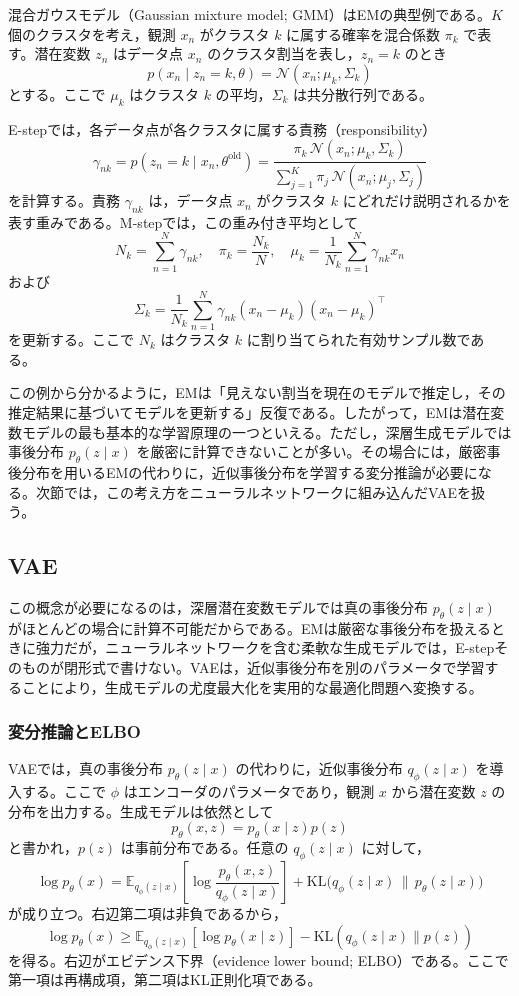 混合ガウスモデル（Gaussian mixture model; GMM）はEMの典型例である。\(K\) 個のクラスタを考え，観測 \(x_n\) がクラスタ \(k\) に属する確率を混合係数 \(\pi_k\) で表す。潜在変数 \(z_n\) はデータ点 \(x_n\) のクラスタ割当を表し，\(z_n=k\) のとき
\[
p(x_n \mid z_n=k,\theta)=\mathcal{N}(x_n;\mu_k,\Sigma_k)
\]
とする。ここで \(\mu_k\) はクラスタ \(k\) の平均，\(\Sigma_k\) は共分散行列である。

E-stepでは，各データ点が各クラスタに属する責務（responsibility）
\[
\gamma_{nk}
=
p(z_n=k \mid x_n,\theta^{\text{old}})
=
\frac{\pi_k\,\mathcal{N}(x_n;\mu_k,\Sigma_k)}
{\sum_{j=1}^{K}\pi_j\,\mathcal{N}(x_n;\mu_j,\Sigma_j)}
\]
を計算する。責務 \(\gamma_{nk}\) は，データ点 \(x_n\) がクラスタ \(k\) にどれだけ説明されるかを表す重みである。M-stepでは，この重み付き平均として
\[
N_k=\sum_{n=1}^{N}\gamma_{nk},\quad
\pi_k=\frac{N_k}{N},\quad
\mu_k=\frac{1}{N_k}\sum_{n=1}^{N}\gamma_{nk}x_n
\]
および
\[
\Sigma_k
=
\frac{1}{N_k}\sum_{n=1}^{N}\gamma_{nk}(x_n-\mu_k)(x_n-\mu_k)^{\top}
\]
を更新する。ここで \(N_k\) はクラスタ \(k\) に割り当てられた有効サンプル数である。

この例から分かるように，EMは「見えない割当を現在のモデルで推定し，その推定結果に基づいてモデルを更新する」反復である。したがって，EMは潜在変数モデルの最も基本的な学習原理の一つといえる。ただし，深層生成モデルでは事後分布 \(p_{\theta}(z \mid x)\) を厳密に計算できないことが多い。その場合には，厳密事後分布を用いるEMの代わりに，近似事後分布を学習する変分推論が必要になる。次節では，この考え方をニューラルネットワークに組み込んだVAEを扱う。

\subsection{VAE}

この概念が必要になるのは，深層潜在変数モデルでは真の事後分布 \(p_{\theta}(z \mid x)\) がほとんどの場合に計算不可能だからである。EMは厳密な事後分布を扱えるときに強力だが，ニューラルネットワークを含む柔軟な生成モデルでは，E-stepそのものが閉形式で書けない。VAEは，近似事後分布を別のパラメータで学習することにより，生成モデルの尤度最大化を実用的な最適化問題へ変換する。

\subsubsection{変分推論とELBO}

VAEでは，真の事後分布 \(p_{\theta}(z \mid x)\) の代わりに，近似事後分布 \(q_{\phi}(z \mid x)\) を導入する。ここで \(\phi\) はエンコーダのパラメータであり，観測 \(x\) から潜在変数 \(z\) の分布を出力する。生成モデルは依然として
\[
p_{\theta}(x,z)=p_{\theta}(x \mid z)p(z)
\]
と書かれ，\(p(z)\) は事前分布である。任意の \(q_{\phi}(z \mid x)\) に対して，
\[
\log p_{\theta}(x)
=
\mathbb{E}_{q_{\phi}(z \mid x)}
\left[
\log \frac{p_{\theta}(x,z)}{q_{\phi}(z \mid x)}
\right]
+
\mathrm{KL}\bigl(q_{\phi}(z \mid x)\,\|\,p_{\theta}(z \mid x)\bigr)
\]
が成り立つ。右辺第二項は非負であるから，
\[
\log p_{\theta}(x) \ge
\mathbb{E}_{q_{\phi}(z \mid x)}[\log p_{\theta}(x \mid z)]
- \mathrm{KL}(q_{\phi}(z \mid x)\|p(z))
\]
を得る。右辺がエビデンス下界（evidence lower bound; ELBO）である。ここで第一項は再構成項，第二項はKL正則化項である。

